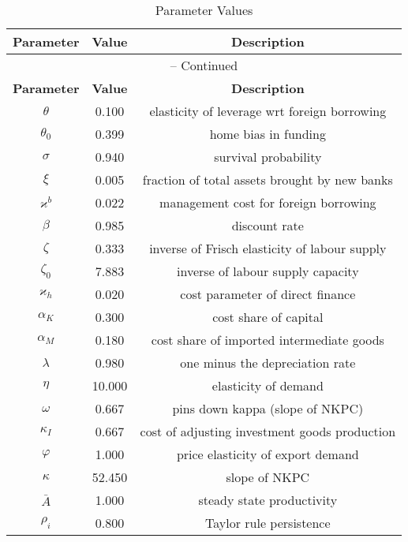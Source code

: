\begin{center}
\begin{longtable}{ccc}
\caption{Parameter Values}\\%
\toprule%
\multicolumn{1}{c}{\textbf{Parameter}} &
\multicolumn{1}{c}{\textbf{Value}} &
 \multicolumn{1}{c}{\textbf{Description}}\\%
\midrule%
\endfirsthead
\multicolumn{3}{c}{{\tablename} \thetable{} -- Continued}\\%
\midrule%
\multicolumn{1}{c}{\textbf{Parameter}} &
\multicolumn{1}{c}{\textbf{Value}} &
  \multicolumn{1}{c}{\textbf{Description}}\\%
\midrule%
\endhead
$\theta$ 	 & 	 0.100 	 & 	 elasticity of leverage wrt foreign borrowing\\
$\theta_{0}$ 	 & 	 0.399 	 & 	 home bias in funding\\
$\sigma$ 	 & 	 0.940 	 & 	 survival probability\\
$\xi$ 	 & 	 0.005 	 & 	 fraction of total assets brought by new banks\\
$\varkappa^{b}$ 	 & 	 0.022 	 & 	 management cost for foreign borrowing\\
$\beta$ 	 & 	 0.985 	 & 	 discount rate\\
$\zeta$ 	 & 	 0.333 	 & 	 inverse of Frisch elasticity of labour supply\\
$\zeta_{0}$ 	 & 	 7.883 	 & 	 inverse of labour supply capacity\\
$\varkappa_{h}$ 	 & 	 0.020 	 & 	 cost parameter of direct finance\\
$\alpha_{K}$ 	 & 	 0.300 	 & 	 cost share of capital\\
$\alpha_{M}$ 	 & 	 0.180 	 & 	 cost share of imported intermediate goods\\
$\lambda$ 	 & 	 0.980 	 & 	 one minus the depreciation rate\\
$\eta$ 	 & 	 10.000 	 & 	 elasticity of demand\\
$\omega$ 	 & 	 0.667 	 & 	 pins down kappa (slope of NKPC)\\
$\kappa_{I}$ 	 & 	 0.667 	 & 	 cost of adjusting investment goods production\\
$\varphi$ 	 & 	 1.000 	 & 	 price elasticity of export demand\\
$\kappa$ 	 & 	 52.450 	 & 	 slope of NKPC\\
$\bar{A}$ 	 & 	 1.000 	 & 	 steady state productivity\\
$\rho_{i}$ 	 & 	 0.800 	 & 	 Taylor rule persistence\\

\end{longtable}
\end{center}
